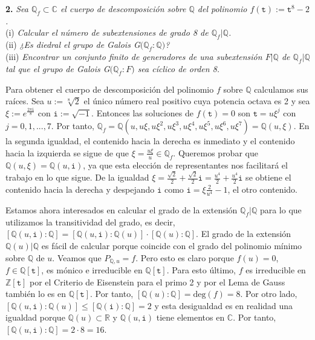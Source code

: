 
\textbf{2.} \textit{Sea $\mathbb{Q}_f \subset \mathbb{C}$ el cuerpo de descomposición sobre $\mathbb{Q}$ del polinomio $f(\mathtt{t}) := \mathtt{t}^8 - 2$.}
\\
(i)  \textit{Calcular el número de subextensiones de grado 8 de $\mathbb{Q}_f|\mathbb{Q}$.}
\\
(ii) \textit{¿Es diedral el grupo de Galois G$\mathrm{(}\mathbb{Q}_f:\mathbb{Q}\mathrm{)}$?}
\\
(iii) \textit{Encontrar un conjunto finito de generadores de una subextensión $F|\mathbb{Q}$ de $\mathbb{Q}_f|\mathbb{Q}$ tal que el grupo de Galois G$\mathrm{(}\mathbb{Q}_f:F\mathrm{)}$ sea cíclico de orden 8.}

Para obtener el cuerpo de descomposición del polinomio $f$ sobre $\mathbb{Q}$ calculamos sus raíces. Sea $u:=\sqrt[8]{2}$ el único número real positivo cuya potencia octava es 2 y sea $\xi:=e^\frac{2\pi\mathtt{i}}{8}$ con $\mathtt{i}:=\sqrt{-1}$. Entonces las soluciones de $f(\mathtt{t})=0$ son $\mathtt{t}=u\xi^j$ con $j=0,1,...,7$. Por tanto, $\mathbb{Q}_f=\mathbb{Q}(u,u\xi,u\xi^2,u\xi^3,u\xi^4,u\xi^5,u\xi^6,u\xi^7)=\mathbb{Q}(u,\xi)$. En la segunda igualdad, el contenido hacia la derecha es inmediato y el contenido hacia la izquierda se sigue de que $\xi=\frac{u\xi}{u}\in\mathbb{Q}_f$. Queremos probar que $\mathbb{Q}(u,\xi)=\mathbb{Q}(u,\mathtt{i})$, ya que esta elección de representantes nos facilitará el trabajo en lo que sigue. De la igualdad  $\xi=\frac{\sqrt{2}}{2}+\frac{\sqrt{2}}{2}\mathtt{i}=\frac{u^4}{2}+\frac{u^4}{2}\mathtt{i}$ se obtiene el contenido hacia la derecha y despejando $\mathtt{i}$ como $\mathtt{i}=\xi\frac{2}{u^4}-1$, el otro contenido.

Estamos ahora interesados en calcular el grado de la extensión $\mathbb{Q}_f|\mathbb{Q}$ para lo que utilizamos la transitividad del grado, es decir, $[\mathbb{Q}(u,\mathtt{i}):\mathbb{Q}]=[\mathbb{Q}(u,\mathtt{i}):\mathbb{Q}(u)]\cdot[\mathbb{Q}(u):\mathbb{Q}]$. El grado de la extensión $\mathbb{Q}(u)|\mathbb{Q}$ es fácil de calcular porque coincide con el grado del polinomio mínimo sobre $\mathbb{Q}$ de $u$. Veamos que $P_{\mathbb{Q},u}=f$. Pero esto es claro porque $f(u)=0$, $f\in\mathbb{Q}[\mathtt{t}]$, es mónico e irreducible en $\mathbb{Q}[\mathtt{t}]$. Para esto último, $f$ es irreducible en $\mathbb{Z}[\mathtt{t}]$ por el Criterio de Eisenstein para el primo 2 y por el Lema de Gauss también lo es en $\mathbb{Q}[\mathtt{t}]$. Por tanto, $[\mathbb{Q}(u):\mathbb{Q}]=\textrm{deg}(f)=8$. Por otro lado, $[\mathbb{Q}(u,\mathtt{i}):\mathbb{Q}(u)]\leq [\mathbb{Q}(\mathtt{i}):\mathbb{Q}]=2$ y esta desigualdad es en realidad una igualdad porque $\mathbb{Q}(u)\subset\mathbb{R}$ y $\mathbb{Q}(u,\mathtt{i})$ tiene elementos en $\mathbb{C}$. Por tanto, $[\mathbb{Q}(u,\mathtt{i}):\mathbb{Q}]=2\cdot8=16$. 

